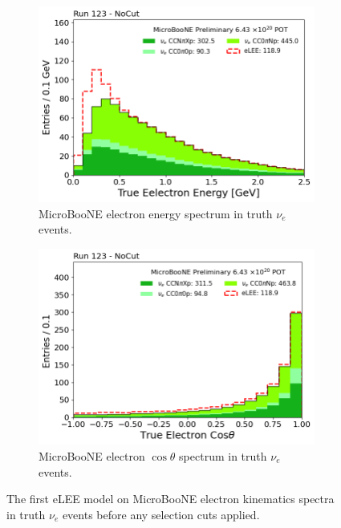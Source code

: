 \begin{figure}[H]
    \centering
    \begin{subfigure}{0.49\linewidth}
        \includegraphics[width=\linewidth]{technote/SignalModel/Figures/old eLEE model shwKE.png}
        \caption{MicroBooNE electron energy spectrum in truth $\nu_e$ events.}
    \end{subfigure}    
    \begin{subfigure}{0.49\linewidth}
        \includegraphics[width=\linewidth]{technote/SignalModel/Figures/old eLEE model shwAngle.png}
        \caption{MicroBooNE electron $\cos\theta$ spectrum in truth $\nu_e$ events.}
    \end{subfigure}
    \caption{The first eLEE model on MicroBooNE electron kinematics spectra in truth $\nu_e$ events before any selection cuts applied.}
    \label{fig:old_eLEE_truth}
\end{figure}

